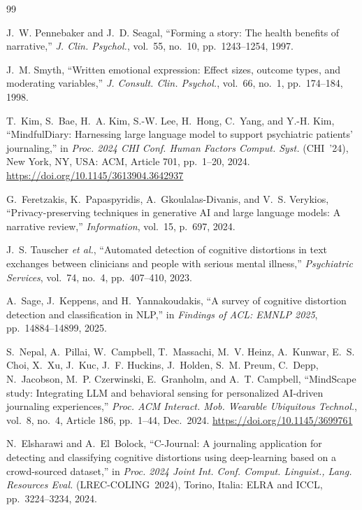 \documentclass[12pt, letterpaper]{article}
\begin{document}
\begin{thebibliography}{99}

J.~W. Pennebaker and J.~D. Seagal,
``Forming a story: The health benefits of narrative,''
\textit{J. Clin. Psychol.},
vol.~55, no.~10, pp.~1243--1254, 1997.

J.~M. Smyth,
``Written emotional expression: Effect sizes, outcome types,
and moderating variables,''
\textit{J. Consult. Clin. Psychol.},
vol.~66, no.~1, pp.~174--184, 1998.

T.~Kim, S.~Bae, H.~A. Kim, S.-W. Lee, H.~Hong,
C.~Yang, and Y.-H. Kim,
``MindfulDiary: Harnessing large language model to support
psychiatric patients' journaling,''
in \textit{Proc. 2024 CHI Conf. Human Factors Comput. Syst.}
(CHI~'24), New York, NY, USA: ACM, Article 701,
pp.~1--20, 2024.
\url{https://doi.org/10.1145/3613904.3642937}

G.~Feretzakis, K.~Papaspyridis, A.~Gkoulalas-Divanis,
and V.~S. Verykios,
``Privacy-preserving techniques in generative AI and large
language models: A narrative review,''
\textit{Information}, vol.~15, p.~697, 2024.

J.~S. Tauscher \textit{et al.},
``Automated detection of cognitive distortions in text
exchanges between clinicians and people with serious mental
illness,''
\textit{Psychiatric Services},
vol.~74, no.~4, pp.~407--410, 2023.

A.~Sage, J.~Keppens, and H.~Yannakoudakis,
``A survey of cognitive distortion detection and
classification in NLP,''
in \textit{Findings of ACL: EMNLP 2025},
pp.~14884--14899, 2025.

S.~Nepal, A.~Pillai, W.~Campbell, T.~Massachi,
M.~V. Heinz, A.~Kunwar, E.~S. Choi, X.~Xu,
J.~Kuc, J.~F. Huckins, J.~Holden, S.~M. Preum,
C.~Depp, N.~Jacobson, M.~P. Czerwinski,
E.~Granholm, and A.~T. Campbell,
``MindScape study: Integrating LLM and behavioral sensing
for personalized AI-driven journaling experiences,''
\textit{Proc. ACM Interact. Mob. Wearable Ubiquitous
Technol.}, vol.~8, no.~4, Article 186,
pp.~1--44, Dec.~2024.
\url{https://doi.org/10.1145/3699761}

N.~Elsharawi and A.~El~Bolock,
``C-Journal: A journaling application for detecting and
classifying cognitive distortions using deep-learning based
on a crowd-sourced dataset,''
in \textit{Proc. 2024 Joint Int. Conf. Comput. Linguist.,
Lang. Resources Eval.} (LREC-COLING~2024),
Torino, Italia: ELRA and ICCL,
pp.~3224--3234, 2024.


\end{thebibliography}
\end{document}
